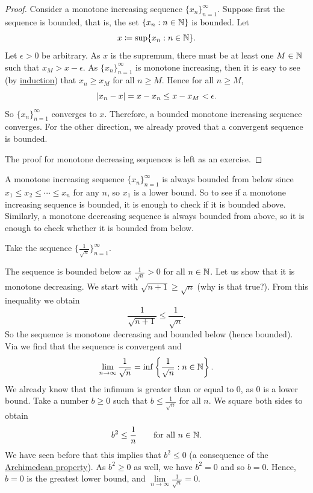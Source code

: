 \begin{proof}
Consider a monotone increasing sequence $\{ x_n \}_{n=1}^\infty$.  Suppose 
first the sequence is bounded,
that is,
the set $\{ x_n : n \in  {\mathbb{N}} \}$ is bounded.  Let
\begin{equation*}
x \coloneqq \sup \{ x_n : n \in {\mathbb{N}} \} .
\end{equation*}
Let $\epsilon > 0$ be arbitrary.  As $x$ is the supremum,
there must be at least one $M \in {\mathbb{N}}$ such that $x_{M} > x-\epsilon$.
As $\{ x_n \}_{n=1}^\infty$ is monotone increasing,
then it is easy to see (by \hyperref[induction:thm]{induction}) that
$x_n \geq x_{M}$ for all $n \geq M$.  Hence for all $n \geq M$,
\begin{equation*}
\left\lvert {x_n-x} \right\rvert = x-x_n \leq x-x_{M} < \epsilon  .
\end{equation*}
So $\{ x_n \}_{n=1}^\infty$ converges to $x$.
Therefore, a bounded monotone increasing sequence converges.
For the other direction, we already proved that a convergent sequence
is bounded.

The proof for monotone decreasing sequences is left as an exercise.
\end{proof}

A monotone increasing sequence $\{ x_n \}_{n=1}^\infty$
is always bounded from below since $x_1 \leq x_2 \leq \cdots \leq x_n$
for any $n$, so $x_1$ is a lower bound.  So to see if a 
monotone increasing sequence is bounded, it is enough to check if
it is bounded above.  Similarly, a monotone decreasing sequence
is always bounded from above, so it is enough to check whether it
is bounded from below.

\begin{example}
Take the sequence $\bigl\{ \frac{1}{\sqrt{n}} \bigr\}_{n=1}^\infty$.

The sequence is
bounded below as
$\frac{1}{\sqrt{n}} > 0$ for all $n \in {\mathbb{N}}$.
Let us show that it is monotone decreasing.  We start with
$\sqrt{n+1} \geq \sqrt{n}$ (why is that true?).  From this inequality
we obtain
\begin{equation*}
\frac{1}{\sqrt{n+1}} \leq \frac{1}{\sqrt{n}} .
\end{equation*}
So the sequence is monotone decreasing and bounded below (hence
bounded).  Via  we find that the sequence is
convergent and
\begin{equation*}
\lim_{n\to \infty} \frac{1}{\sqrt{n}}
=
\inf \left\{ \frac{1}{\sqrt{n}} : n \in {\mathbb{N}} \right\} .
\end{equation*}
We already know that the infimum is greater than or equal to 0, as
0 is a lower bound.  Take a number $b \geq 0$ such
that $b \leq \frac{1}{\sqrt{n}}$ for all $n$.  We square both sides to
obtain
\begin{equation*}
b^2 \leq \frac{1}{n} \qquad \text{for all } n \in {\mathbb{N}}.
\end{equation*}
We have seen before that this implies that $b^2 \leq 0$ (a consequence
of the \hyperref[thm:arch:i]{Archimedean property}).  As $b^2 \geq 0$ as
well, we have $b^2 = 0$
and so $b = 0$.
Hence, $b=0$ is the greatest lower bound, and $\lim\limits_{n\to\infty} \frac{1}{\sqrt{n}} = 0$.
\end{example}

